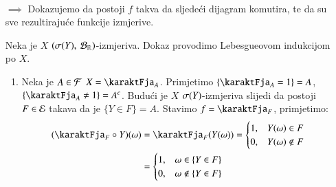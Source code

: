 \begin{rj}[\ref{zad:3.20}]
    \quad \\
    \begin{itemize}
        \item[$\implies$]
        Dokazujemo da postoji $f$ takva da sljede\' ci dijagram komutira, te da su sve rezultiraju\' ce funkcije izmjerive.
        \begin{figure}[H]
            \centering
        \end{figure}
        Neka je $X$ $({\sigma({Y})}, \: {\mathcal{B}_{\mathbb{R}}})$-izmjeriva.
        Dokaz provodimo Lebesgueovom indukcijom po $X$.
        \begin{enumerate}[label=(\arabic*. korak)]
            \item Neka je $A \in \mathcal{F}$ $X = \karaktFja_A$.
            Primjetimo $\{ \karaktFja_A = 1 \} = A$, $\{ \karaktFja_A \neq 1 \} = A^c$.
            Budu\' ci je $X$ $\sigma({Y})$-izmjeriva slijedi da postoji $F \in \mathcal{E}$ takava da je $\{Y \in F\} = A$.
            Stavimo $f = \karaktFja_F$, primjetimo:
            \begin{equation*}
                \begin{aligned}
                    (\karaktFja_F \circ Y)(\omega)
                    &= \karaktFja_F (Y(\omega))
                    =
                    \begin{cases}
                        1, &Y(\omega) \in F\\
                        0, &Y(\omega) \notin F 
                    \end{cases}\\
                    &=
                    \begin{cases}
                        1, &\omega \in \{Y \in F\}\\
                        0, &\omega \notin \{Y \in F\}
                    \end{cases}

\end{aligned}
\end{equation*}
\end{enumerate}
\end{itemize}
\end{rj}
